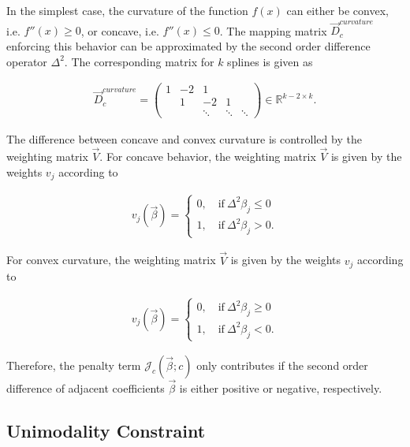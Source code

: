\documentclass[10pt,a4paper]{report}
\begin{document}
In the simplest case, the curvature of the function $f(x)$ can either be convex, i.e. $f''(x) \ge 0$, or concave, i.e. $f''(x) \le 0$. The mapping matrix $\vec{D}_c^{curvature}$ enforcing this behavior can be approximated by the second order difference operator $\Delta^2$. The corresponding matrix for $k$ splines is given as

\begin{align} \label{eq:D_c_curvature}
	\vec{D}_c^{curvature} = \begin{pmatrix} 1 & -2 & 1 		&  		 & \\ 
		& 1  &-2 	    &1 		 & \\
		& 	  & \ddots  & \ddots & \ddots  
	\end{pmatrix} \in \mathbb{R}^{k-2 \times k}.
\end{align}	

The difference between concave and convex curvature is controlled by the weighting matrix $\vec{V}$. For concave behavior, the weighting matrix $\vec{V}$ is given by the weights $v_j$ according to

\begin{align}\label{eq:v_curvature_concave}
	v_j(\vec{\beta}) = \begin{cases} 
		0, \quad \text{if} \ \Delta^2\beta_j \le 0 \\ 
		1, \quad \text{if} \ \Delta^2\beta_j > 0. 
	\end{cases}
\end{align}

For convex curvature, the weighting matrix $\vec{V}$ is given by the weights $v_j$ according to

\begin{align}\label{eq:v_curvature_convex}
	v_j(\vec{\beta}) = \begin{cases} 
		0, \quad \text{if} \ \Delta^2\beta_j \ge 0 \\ 
		1, \quad \text{if} \ \Delta^2\beta_j < 0. 
	\end{cases}
\end{align}	

Therefore, the penalty term $\mathcal{J}_c(\vec{\beta}; c)$ only contributes if the second order difference of adjacent coefficients $\vec{\beta}$ is either positive or negative, respectively. \cite{eilers2005unimodal}

\subsection{Unimodality Constraint}
\end{document}

